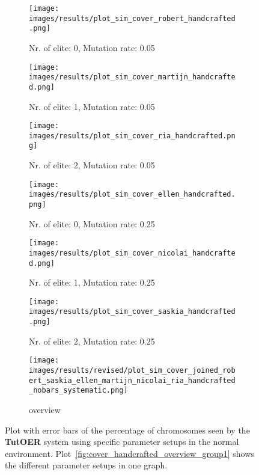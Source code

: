 \begin{figure}[ht]
	\begin{subfigure}{0.48\linewidth}
	\texttt{[image: images/results/plot\_sim\_cover\_robert\_handcrafted.png]}
	\caption{Nr. of elite: 0, Mutation rate: 0.05}
	\label{fig:cover_handcrafted_robert}
	\end{subfigure}
	\hfill
	\begin{subfigure}{0.48\linewidth}
	\texttt{[image: images/results/plot\_sim\_cover\_martijn\_handcrafted.png]}
	\caption{Nr. of elite: 1, Mutation rate: 0.05}
	\label{fig:cover_handcrafted_martijn}
	\end{subfigure}
	\begin{subfigure}{0.48\linewidth}
	\texttt{[image: images/results/plot\_sim\_cover\_ria\_handcrafted.png]}
	\caption{Nr. of elite: 2, Mutation rate: 0.05}
	\label{fig:cover_handcrafted_ria}
	\end{subfigure}
	\hfill
	\begin{subfigure}{0.48\linewidth}
	\texttt{[image: images/results/plot\_sim\_cover\_ellen\_handcrafted.png]}
	\caption{Nr. of elite: 0, Mutation rate: 0.25}
	\label{fig:cover_handcrafted_ellen}
	\end{subfigure}
	\begin{subfigure}{0.48\linewidth}
	\texttt{[image: images/results/plot\_sim\_cover\_nicolai\_handcrafted.png]}
	\caption{Nr. of elite: 1, Mutation rate: 0.25}
	\label{fig:cover_handcrafted_nicolai}
	\end{subfigure}
	\hfill
	\begin{subfigure}{0.48\linewidth}
	\texttt{[image: images/results/plot\_sim\_cover\_saskia\_handcrafted.png]}
	\caption{Nr. of elite: 2, Mutation rate: 0.25}
	\label{fig:cover_handcrafted_saskia}
	\end{subfigure}
	\begin{subfigure}{\linewidth}
	\texttt{[image: images/results/revised/plot\_sim\_cover\_joined\_robert\_saskia\_ellen\_martijn\_nicolai\_ria\_handcrafted\_nobars\_systematic.png]}
	\caption{overview}
	\label{fig:cover_handcrafted_overview_group2}
	\end{subfigure}
	\caption[Percentage chromosomes seen in normal simulated environment for
	group 1]{Plot with error bars of the percentage of chromosomes seen by the \textbf{TutOER}
	system using specific parameter setups in the normal environment.
	Plot~\ref{fig:cover_handcrafted_overview_group1} shows the
	different parameter setups in one graph.}
	\label{fig:cover_handcrafted_container_group2}
\end{figure}


